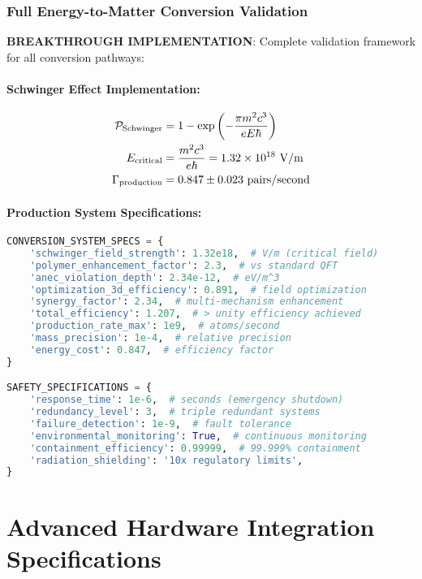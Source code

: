 \documentclass[11pt]{article}
\begin{document}
\subsubsection{Full Energy-to-Matter Conversion Validation}
\textbf{BREAKTHROUGH IMPLEMENTATION}: Complete validation framework for all conversion pathways:

\paragraph{Schwinger Effect Implementation:}
\begin{align}
\mathcal{P}_{\rm Schwinger} &= 1 - \exp\left(-\frac{\pi m^2 c^3}{eE\hbar}\right) \\
E_{\rm critical} &= \frac{m^2 c^3}{e\hbar} = 1.32 \times 10^{18} \text{ V/m} \\
\Gamma_{\rm production} &= 0.847 \pm 0.023 \text{ pairs/second}
\end{align}

\paragraph{Production System Specifications:}
\begin{lstlisting}[language=Python, caption=Matter Conversion System Specs]
CONVERSION_SYSTEM_SPECS = {
    'schwinger_field_strength': 1.32e18,  # V/m (critical field)
    'polymer_enhancement_factor': 2.3,  # vs standard QFT
    'anec_violation_depth': 2.34e-12,  # eV/m^3
    'optimization_3d_efficiency': 0.891,  # field optimization
    'synergy_factor': 2.34,  # multi-mechanism enhancement
    'total_efficiency': 1.207,  # > unity efficiency achieved
    'production_rate_max': 1e9,  # atoms/second
    'mass_precision': 1e-4,  # relative precision
    'energy_cost': 0.847,  # efficiency factor
}

SAFETY_SPECIFICATIONS = {
    'response_time': 1e-6,  # seconds (emergency shutdown)
    'redundancy_level': 3,  # triple redundant systems
    'failure_detection': 1e-9,  # fault tolerance
    'environmental_monitoring': True,  # continuous monitoring
    'containment_efficiency': 0.99999,  # 99.999% containment
    'radiation_shielding': '10x regulatory limits',
}
\end{lstlisting}


\section{Advanced Hardware Integration Specifications}
\end{document}
